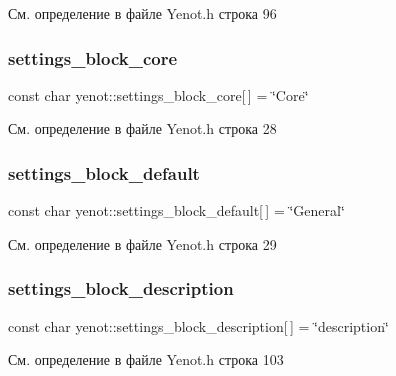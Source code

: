 См. определение в файле Yenot.\+h строка 96

\mbox{\label{namespaceyenot_a2640b6ef7faaea51fd49edfd377c62a5}} 
\subsubsection{\texorpdfstring{settings\+\_\+block\+\_\+core}{settings\_block\_core}}
{\footnotesize\ttfamily const char yenot\+::settings\+\_\+block\+\_\+core\mbox{[}$\,$\mbox{]} = \char`\"{}Core\char`\"{}}



См. определение в файле Yenot.\+h строка 28

\mbox{\label{namespaceyenot_a2c183b5b1119e19804dce22eaad06010}} 
\subsubsection{\texorpdfstring{settings\+\_\+block\+\_\+default}{settings\_block\_default}}
{\footnotesize\ttfamily const char yenot\+::settings\+\_\+block\+\_\+default\mbox{[}$\,$\mbox{]} = \char`\"{}General\char`\"{}}



См. определение в файле Yenot.\+h строка 29

\mbox{\label{namespaceyenot_aea7e9eb4d5b9e645f22e83e2d5fe893e}} 
\subsubsection{\texorpdfstring{settings\+\_\+block\+\_\+description}{settings\_block\_description}}
{\footnotesize\ttfamily const char yenot\+::settings\+\_\+block\+\_\+description\mbox{[}$\,$\mbox{]} = \char`\"{}description\char`\"{}}



См. определение в файле Yenot.\+h строка 103

